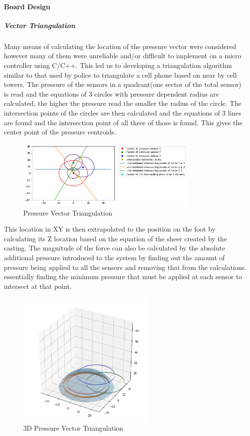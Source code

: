 \paragraph{Board Design}
\subparagraph{Vector Triangulation}
Many means of calculating the location of the pressure vector were considered however many of them were unreliable and/or difficult to implement on a micro controller using C/C++. This led us to developing a triangulation algorithm similar to that used by police to triangulate a cell phone based on near by cell towers. The pressure of the sensors in a quadrant(one sector of the total sensor) is read and the equations of 3 circles with pressure dependent radius are calculated, the higher the pressure read the smaller the radius of the circle. The intersection points of the circles are then calculated and the equations of 3 lines are found and the intersection point of all three of those is found. This gives the center point of the pressure centroids. 
\begin{figure}[H]
    \centering
    \includegraphics[width=0.8\textwidth]{figures/Triangulation.png}
    \caption{Pressure Vector Triangulation}
    \label{fig:PressureVectorTriangulation}
\end{figure}
This location in XY is then extrapolated to the position on the foot by calculating its Z location based on the equation of the sheer created by the casting. The magnitude of the force can also be calculated by the absolute additional pressure introduced to the system by finding out the amount of pressure being applied to all the sensors and removing that from the calculations. essentially finding the minimum pressure that must be applied at each sensor to intersect at that point.
\begin{figure}[H]
    \centering
    \includegraphics[width=0.6\textwidth]{figures/Footsensordome.png}
    \caption{3D Pressure Vector Triangulation}
    \label{fig:3DPressureVectorTriangulation}
\end{figure}

